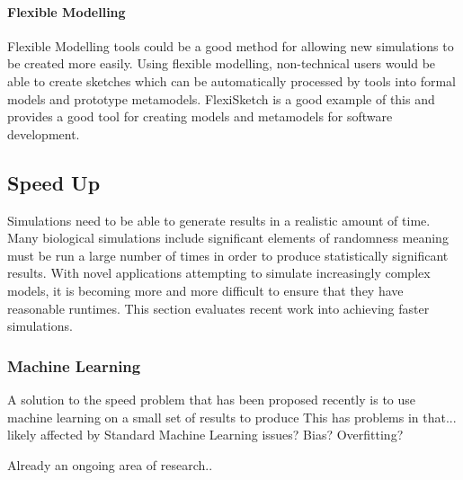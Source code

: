 \documentclass{UoYCSproject}
\begin{document}
\paragraph{Flexible Modelling}
Flexible Modelling tools could be a good method for allowing new simulations to be created more easily.
Using flexible modelling, non-technical users would be able to create sketches which can be automatically processed by tools into formal models and prototype metamodels\cite{Paige2017}.
FlexiSketch is a good example of this and provides a good tool for creating models and metamodels for software development\cite{flexisketch}.

\subsection{Speed Up}
Simulations need to be able to generate results in a realistic amount of time.
Many biological simulations include significant elements of randomness meaning must be run a large number of times in order to produce statistically significant results.
With novel applications attempting to simulate increasingly complex models, it is becoming more and more difficult to ensure that they have reasonable runtimes.
This section evaluates recent work into achieving faster simulations.

\subsubsection{Machine Learning}
A solution to the speed problem that has been proposed recently is to use machine learning on a small set of results to produce\cite{kieran_machine_learning}
This has problems in that...
likely affected by Standard Machine Learning issues? Bias? Overfitting?

Already an ongoing area of research.. 
\end{document}
